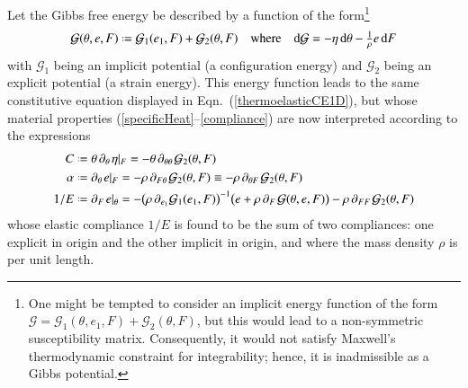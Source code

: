 Let the Gibbs free energy be described by a function of the form\footnote{
    One might be tempted to consider an implicit energy function of the form $\mathcal{G} = \mathcal{G}_1 (\theta ,  e_1 , F ) + \mathcal{G}_2 (\theta , F)$, but this would lead to a non-symmetric susceptibility matrix.  Consequently, it would not satisfy Maxwell's thermo\-dynamic constraint for integrability; hence, it is inadmissible as a Gibbs potential.
}
\begin{equation}
\mathcal{G} (\theta , e , F) \defeq \mathcal{G}_1 ( e_1 , F ) + \mathcal{G}_2 ( \theta , F )
\quad \text{where} \quad
\mathrm{d} \mathcal{G} = -\eta \, \mathrm{d} \theta - 
\tfrac{1}{\rho} e \, \mathrm{d} F
\label{GibbsFreeEnergy}
\end{equation}
with $\mathcal{G}_1$ being an implicit potential (a configuration energy) and $\mathcal{G}_2$ being an explicit potential (a strain energy).  This energy function leads to the same constitutive equation displayed in Eqn.~(\ref{thermoelasticCE1D}), but whose material properties (\ref{specificHeat}--\ref{compliance}) are now interpreted according to the expressions
\begin{subequations}
    \label{physicalFields1Dfiber}
    \begin{align}
    C & \defeq \theta \, \partial_{\theta\,} \eta |_F = 
    -\theta \, \partial_{\theta\theta\,} \mathcal{G}_2(\theta , F)
    \label{specificHeat1D} \\
    \alpha & \defeq \partial_{\theta\,} e |_F = 
    -\rho \, \partial_{F\theta\,} \mathcal{G}_2(\theta , F) \equiv
    -\rho \, \partial_{\theta F\,} \mathcal{G}_2(\theta , F)
    \label{thermalExpansion1D} \\
    1/E & \defeq \partial_{F\,} e |_{\theta} = -
    \bigl( \rho \, \partial_{e_1} \mathcal{G}_1 ( e_1, F ) \bigr)^{-1} 
    \bigl( e + \rho \, \partial_{F\,} \mathcal{G} (\theta , e , F) \bigr) -
    \rho \, \partial_{FF\,} \mathcal{G}_2(\theta , F)
    \label{compliance1D}
    \end{align}
\end{subequations}
whose elastic compliance $1/E$ is found to be the sum of two compliances: one explicit in origin and the other implicit in origin, and where the mass density $\rho$ is per unit length. 

